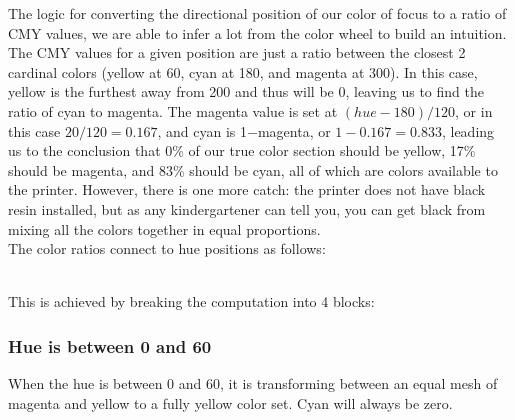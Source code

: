 \documentclass{article}
\begin{document}
\begin{multicols}{2}
\begin{tikzpicture}[x=0.75pt,y=0.75pt,yscale=-1,xscale=1]
\end{tikzpicture}

\noindent
The logic for converting the directional position of our color of focus to a ratio of CMY values, we are able to infer a lot from the color wheel to build an intuition. The CMY values for a given position are just a ratio between the closest 2 cardinal colors (yellow at 60, cyan at 180, and magenta at 300). In this case, yellow is the furthest away from 200 and thus will be 0, leaving us to find the ratio of cyan to magenta. The magenta value is set at $(hue-180)/120$, or in this case $20/120=0.167$, and cyan is 1$-$magenta, or $1-0.167=0.833$, leading us to the conclusion that 0\% of our true color section should be yellow, 17\% should be magenta, and 83\% should be cyan, all of which are colors available to the printer. However, there is one more catch: the printer does not have black resin installed, but as any kindergartener can tell you, you can get black from mixing all the colors together in equal proportions.
\\

\noindent
The color ratios connect to hue positions as follows:

\noindent
{}
\\

\noindent
This is achieved by breaking the computation into 4 blocks:

\subsubsection{Hue is between 0 and 60} \label{0-60}
When the hue is between 0 and 60, it is transforming between an equal mesh of magenta and yellow to a fully yellow color set. Cyan will always be zero.


\end{multicols}
\end{document}
